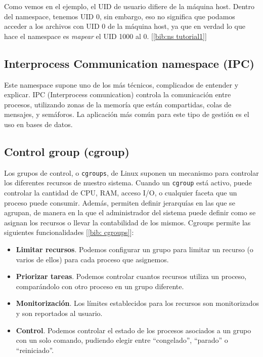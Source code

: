\documentclass[12pt]{article}
\begin{document}
	\addvspace{20px}
	
	\par \noindent Como vemos en el ejemplo, el UID de usuario difiere de la máquina host. Dentro del namespace, tenemos UID 0, sin embargo, eso no significa que podamos acceder a los archivos con UID 0 de la máquina host, ya que en verdad lo que hace el namespace es \textit{mapear} el UID 1000 al 0. [\ref{bib:ns tutorial1}]
	
	
	\subsection{Interprocess Communication namespace (IPC)}
	\par \noindent Este namespace supone uno de los más técnicos, complicados de entender y explicar. IPC (Interprocess comunication) controla la comunicación entre procesos, utilizando zonas de la memoría que están compartidas, colas de mensajes, y semáforos. La aplicación más común para este tipo de gestión es el uso en bases de datos.
	
	\pagebreak
	
	\subsection{Control group (cgroup)}
	\par \noindent Los grupos de control, o \texttt{cgroups}, de Linux suponen un mecanismo para controlar los diferentes recursos de nuestro sistema. Cuando un \texttt{cgroup} está activo, puede controlar la cantidad de CPU, RAM, acceso I/O, o cualquier faceta que un proceso puede consumir. Además, permiten definir jerarquías en las que se agrupan, de manera en la que el administrador del sistema puede definir como se asignan los recursos o llevar la contabilidad de los mismos. Cgroups permite las siguientes funcionalidades [\ref{bib: cgroups}]: 
	\begin{itemize}
		\item \textbf{Limitar recursos}. Podemos configurar un grupo para limitar un recurso (o varios de ellos) para cada proceso que asignemos.
		\item \textbf{Priorizar tareas}. Podemos controlar cuantos recursos utiliza un proceso, comparándolo con otro proceso en un grupo diferente.
		\item \textbf{Monitorización}. Los límites establecidos para los recursos son monitorizados y son reportados al usuario.
		\item \textbf{Control}. Podemos controlar el estado de los procesos asociados a un grupo con un solo comando, pudiendo elegir entre ``congelado'', ``parado'' o ``reiniciado''.
	\end{itemize}
	
\end{document}
